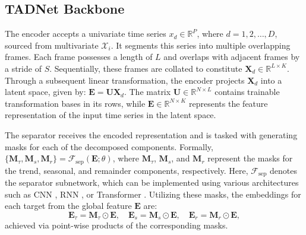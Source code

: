 \documentclass{article}
\begin{document}
\subsection{TADNet Backbone}


The encoder accepts a univariate time series \(x_d\in\mathbb{R}^{P}\), where \(d=1,2,\ldots,D\), sourced from multivariate \(\mathcal{X}_i\). It segments this series into multiple overlapping frames. Each frame possesses a length of \( L \) and overlaps with adjacent frames by a stride of \( S \). Sequentially, these frames are collated to constitute \( \mathbf{X}_d \in \mathbb{R}^{L \times K} \). Through a subsequent linear transformation, the encoder projects \( \mathbf{X}_d \) into a latent space, given by:
$\mathbf{E} = \mathbf{U}\mathbf{X}_d.$
The matrix \( \mathbf{U} \in \mathbb{R}^{N \times L} \) contains trainable transformation bases in its rows, while \( \mathbf{E} \in \mathbb{R}^{N \times K} \) represents the feature representation of the input time series in the latent space.


The separator receives the encoded representation and is tasked with generating masks for each of the decomposed components. Formally, \(\{ \mathbf{M}_{\tau}, \mathbf{M}_s, \mathbf{M}_r \} = \mathcal{F}_{\text{sep}}(\mathbf{E}; \theta)\), where \(\mathbf{M}_{\tau}\), \(\mathbf{M}_s\), and \(\mathbf{M}_r\) represent the masks for the trend, seasonal, and remainder components, respectively. Here, \(\mathcal{F}_{\text{sep}}\) denotes the separator subnetwork, which can be implemented using various architectures such as CNN \cite{luo2019conv}, RNN \cite{luo2020dual}, or Transformer \cite{subakan2021attention}.
Utilizing these masks, the embeddings for each target from the global feature \( \mathbf{E} \) are:
\begin{equation}
\mathbf{E}_{\tau}= \mathbf{M}_{\tau} \odot \mathbf{E}, \quad
\mathbf{E}_s= \mathbf{M}_s \odot \mathbf{E}, \quad
\mathbf{E}_r= \mathbf{M}_r \odot \mathbf{E},
\end{equation}
achieved via point-wise products of the corresponding masks.
\end{document}
